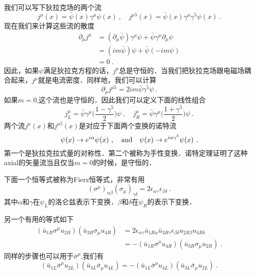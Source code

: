 我们可以写下狄拉克场的两个流
\begin{equation}
j^\mu(x) = \bar\psi(x)\gamma^\mu\psi(x)~, \quad j^{\mu 5}(x) = \bar\psi(x)\gamma^\mu\gamma^5\psi(x)~.
\end{equation}
现在我们来计算这些流的散度
\begin{align}\nonumber
\partial_\mu j^\mu & = (\partial_\mu \bar\psi)\gamma^\mu\psi + \bar\psi\gamma^\mu\partial_\mu\psi \\\nonumber
& = (im \bar\psi) \psi + \bar\psi(-i m \psi)\\
& = 0 ~.
\end{align}
因此，如果$\psi$满足狄拉克方程的话，$j^\mu$总是守恒的．当我们把狄拉克场跟电磁场耦合起来，$j^\mu$就是电流密度．同样地，我们可以计算
\begin{equation}
\partial_\mu j^{\mu 5} = 2 i m \bar\psi \gamma^5 \psi ~.
\end{equation}
如果$m=0$,这个流也是守恒的．因此我们可以定义下面的线性组合
\begin{equation}
j^\mu_L = \bar \psi \gamma^\mu \bigg( \frac{1-\gamma^5}{2} \bigg)\psi ~, \quad j^\mu_R = \bar \psi \gamma^\mu \bigg( \frac{1+\gamma^5}{2} \bigg)\psi ~.
\end{equation}
两个流$j^\mu(x)$和$j^{\mu 5}(x)$是对应于下面两个变换的诺特流
\begin{equation}
\psi(x) \rightarrow e^{i\alpha} \psi(x) ~, \quad {\rm and} \quad \psi(x)\rightarrow e^{i\alpha\gamma^5}\psi(x)~.
\end{equation}
第一个是狄拉克拉式量的对称性．第二个被称为手性变换．诺特定理证明了这种axial的矢量流当且仅当$m=0$的时候，是守恒的．

下面一个恒等式被称为Fierz恒等式，非常有用
\begin{equation}
(\sigma^\mu)_{\alpha\beta}(\sigma_\mu)_{\gamma\delta} = 2 \epsilon_{\alpha\gamma} \epsilon_{\beta\delta}~.
\end{equation}
其中$\alpha$和$\gamma$在$\psi_L$的洛仑兹表示下变换．$\beta$和$\delta$在$\psi_R$的表示下变换．

另一个有用的等式如下
\begin{align}\nonumber
(\bar u_{1R}\sigma^\mu u_{2R})(\bar u_{3R}\sigma_{\mu}u_{4R}) & = 2 \epsilon_{\alpha\gamma} \bar u_{1R\alpha} \bar u_{3R\gamma} \epsilon_{\beta\delta } u_{2 R \beta} u_{4 R \delta }\\
& = - (\bar u_{1R} \sigma^\mu u_{4R})(\bar u_{3R}\sigma_\mu u_{2R})~.
\end{align}
同样的步骤也可以用于$\bar\sigma^\mu$,我们有
\begin{equation}
(\bar u_{1L}\bar \sigma^\mu u_{2L})(\bar u_{3L}\bar \sigma_\mu u_{4L}) = -(\bar u_{1L}\bar \sigma^\mu u_{4L} )(\bar u_{3L}\bar \sigma_\mu u_{2L})~.
\end{equation}





